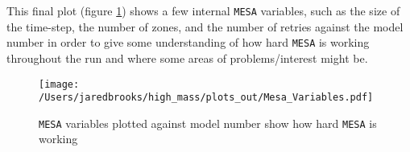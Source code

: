 \documentclass{article}
\begin{document}
        \pagebreak

        This final plot (figure \ref{fig:5}) shows a few internal \texttt{MESA} variables, such as the size of the time-step, the number of zones, and the number of retries against the model number in order to give some understanding of how hard \texttt{MESA} is working throughout the run and where some areas of problems/interest might be.

        \begin{figure}[H]
          \centering
          \texttt{[image: /Users/jaredbrooks/high\_mass/plots\_out/Mesa\_Variables.pdf]}
          \caption{\texttt{MESA} variables plotted against model number show how hard \texttt{MESA} is working}
          \label{fig:5}
        \end{figure}
\end{document}
